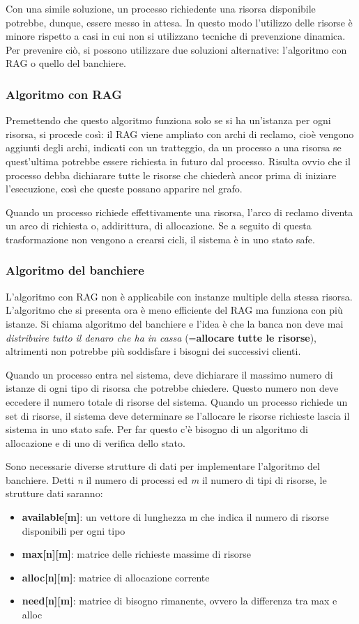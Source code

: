 \documentclass[a4paper]{article}
\begin{document}
Con una simile soluzione, un processo richiedente una risorsa disponibile potrebbe, dunque, essere messo in attesa. In questo modo l'utilizzo delle risorse è minore rispetto a casi in cui non si utilizzano tecniche di prevenzione dinamica. Per prevenire ciò, si possono utilizzare due soluzioni alternative: l'algoritmo con RAG o quello del banchiere.

\subsubsection{Algoritmo con RAG}
Premettendo che questo algoritmo funziona solo se si ha un'istanza per ogni risorsa, si procede così: il RAG viene ampliato con archi di reclamo, cioè vengono aggiunti degli archi, indicati con un tratteggio, da un processo a una risorsa se quest'ultima potrebbe essere richiesta in futuro dal processo. Risulta ovvio che il processo debba dichiarare tutte le risorse che chiederà ancor prima di iniziare l'esecuzione, così che queste possano apparire nel grafo.

Quando un processo richiede effettivamente una risorsa, l'arco di reclamo diventa un arco di richiesta o, addirittura, di allocazione. Se a seguito di questa trasformazione non vengono a crearsi cicli, il sistema è in uno stato safe.

\subsubsection{Algoritmo del banchiere}
L'algoritmo con RAG non è applicabile con instanze multiple della stessa risorsa. L'algoritmo che si presenta ora è meno efficiente del RAG ma funziona con più istanze. Si chiama algoritmo del banchiere e l'idea è che la banca non deve mai \textit{distribuire tutto il denaro che ha in cassa} (=\textbf{allocare tutte le risorse}), altrimenti non potrebbe più soddisfare i bisogni dei successivi clienti.

Quando un processo entra nel sistema, deve dichiarare il massimo numero di istanze di ogni tipo di risorsa che potrebbe chiedere. Questo numero non deve eccedere il numero totale di risorse del sistema. Quando un processo richiede un set di risorse, il sistema deve determinare se l'allocare le risorse richieste lascia il sistema in uno stato safe. Per far questo c'è bisogno di un algoritmo di allocazione e di uno di verifica dello stato.

Sono necessarie diverse strutture di dati per implementare l'algoritmo del banchiere. Detti \textit{n} il numero di processi ed \textit{m} il numero di tipi di risorse, le strutture dati saranno:
\begin{itemize}
   \item \textbf{available[m]}: un vettore di lunghezza m che indica il numero di risorse disponibili per ogni tipo
   \item \textbf{max[n][m]}: matrice delle richieste massime di risorse
   \item \textbf{alloc[n][m]}: matrice di allocazione corrente
   \item \textbf{need[n][m]}: matrice di bisogno rimanente, ovvero la differenza tra max e alloc
\end{itemize}
\end{document}
